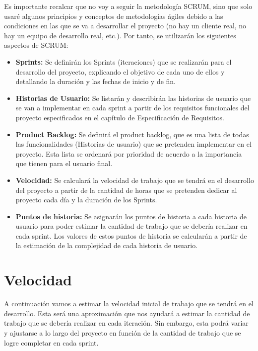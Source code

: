 Es importante recalcar que no voy a seguir la metodología SCRUM, sino que solo usaré algunos principios y 
conceptos de metodologías ágiles debido a las condiciones en las que se va a desarrollar el proyecto 
(no hay un cliente real, no hay un equipo de desarrollo real, etc.). Por tanto, se utilizarán los siguientes aspectos de SCRUM:
\begin{itemize}
    \item \textbf{Sprints:} Se definirán los Sprints (iteraciones) que se realizarán para el desarrollo del proyecto, explicando
    el objetivo de cada uno de ellos y detallando la duración y las fechas de inicio y de fin.
    \item \textbf{Historias de Usuario:} Se listarán y describirán las historias de usuario que se van a implementar en cada sprint a partir
    de los requisitos funcionales del proyecto especificados en el capítulo de Especificación de Requisitos.
    \item \textbf{Product Backlog: } Se definirá el product backlog, que es una lista de todas las funcionalidades (Historias de usuario) que se
    pretenden implementar en el proyecto. Esta lista se ordenará por prioridad de acuerdo a la importancia que tienen para el usuario final.
    \item \textbf{Velocidad:} Se calculará la velocidad de trabajo que se tendrá en el desarrollo del proyecto a partir de la cantidad de horas
    que se pretenden dedicar al proyecto cada día y la duración de los Sprints.
    \item \textbf{Puntos de historia: } Se asignarán los puntos de historia a cada historia de usuario para poder estimar la cantidad de trabajo
    que se debería realizar en cada sprint. Los valores de estos puntos de historia se calcularán a partir de la estimación de la complejidad de cada historia de usuario.
\end{itemize}



\section{Velocidad}
A continuación vamos a estimar la velocidad inicial de trabajo que se tendrá en el desarrollo. Esta será una aproximación
que nos ayudará a estimar la cantidad de trabajo que se debería realizar en cada iteración. Sin embargo, esta podrá variar
y ajustarse a lo largo del proyecto en función de la cantidad de trabajo que se logre completar en cada sprint.

